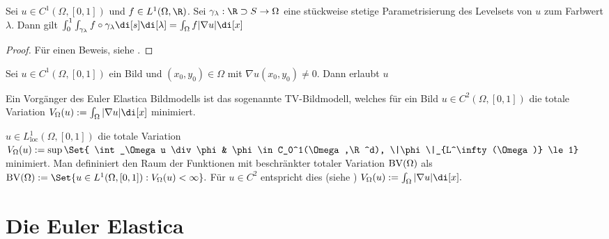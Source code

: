 \documentclass{mythesis}
\begin{document}
\begin{proposition} \label{satz:coarea}
    Sei $u \in C^1(\Omega, [0,1])$ und $f \in L^1(\Omega, \R)$.
    Sei $\gamma_\lambda: \R \supset S \to \Omega$ eine stückweise stetige Parametrisierung des Levelsets von $u$ zum Farbwert $\lambda$.
    Dann gilt
    \begin{math}
	\int_0^1 \int_{\gamma_\lambda} f \circ \gamma_\lambda \di[s] \di[\lambda]
	= \int_\Omega f |\nabla u| \di[x]
    \end{math}
    \begin{proof}
        Für einen Beweis, siehe \cite{??}.
    \end{proof}
\end{proposition}



Sei $u \in C^1(\Omega, [0,1])$ ein Bild und $(x_0, y_0) \in \Omega$ mit $\nabla u(x_0, y_0) \neq 0$.
Dann erlaubt $u $



Ein Vorgänger des Euler Elastica Bildmodells ist das sogenannte TV-Bildmodell, welches für ein Bild $u \in C^2(\Omega, [0,1])$ die totale Variation
\begin{math}
    V_\Omega(u) := \int_\Omega |\nabla u| \di[x]
\end{math}
minimiert.






$u \in L^1_{\mathrm{loc}}(\Omega, [0,1])$ die totale Variation
\begin{math}
    V_\Omega(u) := \sup\Set{ \int_\Omega u \div \phi & \phi \in C_0^1(\Omega,\R^d), \|\phi\|_{L^\infty(\Omega)} \le 1}
\end{math}
minimiert.
Man defininiert den Raum der Funktionen mit beschränkter totaler Variation $\mathord{\mathrm{BV}}(\Omega)$ als
\begin{math}
    \BV(\Omega) := \Set{u \in L^1(\Omega, [0,1]) : V_\Omega(u) < \infty}.
\end{math}
Für $u \in C^2$ entspricht dies (siehe \cite[§2.2]{chan2015image})
\begin{math}
    V_\Omega(u) := \int_\Omega |\nabla u| \di[x].
\end{math}






\section{Die Euler Elastica}
\end{document}

